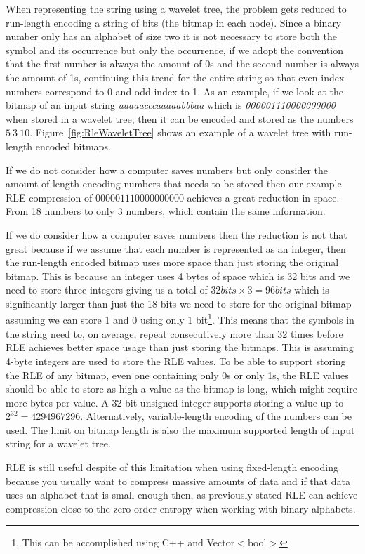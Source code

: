 When representing the string using a wavelet tree, the problem gets reduced to run-length encoding a string of bits (the bitmap in each node).
Since a binary number only has an alphabet of size two it is not necessary to store both the symbol and its occurrence but only the occurrence, if we adopt the convention that the first number is always the amount of 0s and the second number is always the amount of 1s, continuing this trend for the entire string so that even-index numbers correspond to 0 and odd-index to 1. 
As an example, if we look at the bitmap of an input string \textit{aaaaacccaaaaabbbaa} which is \textit{000001110000000000} when stored in a wavelet tree, then it can be encoded and stored as the numbers $5~3~10$.
Figure~\ref{fig:RleWaveletTree} shows an example of a wavelet tree with run-length encoded bitmaps.

If we do not consider how a computer saves numbers but only consider the amount of length-encoding numbers that needs to be stored then our example RLE compression of $000001110000000000$ achieves a great reduction in space.
From 18 numbers to only 3 numbers, which contain the same information.

If we do consider how a computer saves numbers then the reduction is not that great because if we assume that each number is represented as an integer, then the run-length encoded bitmap uses more space than just storing the original bitmap. 
This is because an integer uses 4 bytes of space which is 32 bits and we need to store three integers giving us a total of $32 bits \times 3 = 96 bits$ which is significantly larger than just the 18 bits we need to store for the original bitmap assuming we can store 1 and 0 using only 1 bit\footnote{This can be accomplished using C++ and Vector$<$bool$>$}. 
This means that the symbols in the string need to, on average, repeat consecutively more than 32 times before RLE achieves better space usage than just storing the bitmaps.
This is assuming 4-byte integers are used to store the RLE values. 
To be able to support storing the RLE of any bitmap, even one containing only 0s or only 1s, the RLE values should be able to store as high a value as the bitmap is long, which might require more bytes per value.
A 32-bit unsigned integer supports storing a value up to $2^{32} = \num{4294967296}$.
Alternatively, variable-length encoding of the numbers can be used.
The limit on bitmap length is also the maximum supported length of input string for a wavelet tree.

RLE is still useful despite of this limitation when using fixed-length encoding because you usually want to compress massive amounts of data and if that data uses an alphabet that is small enough then, as previously stated RLE can achieve compression close to the zero-order entropy when working with binary alphabets.

